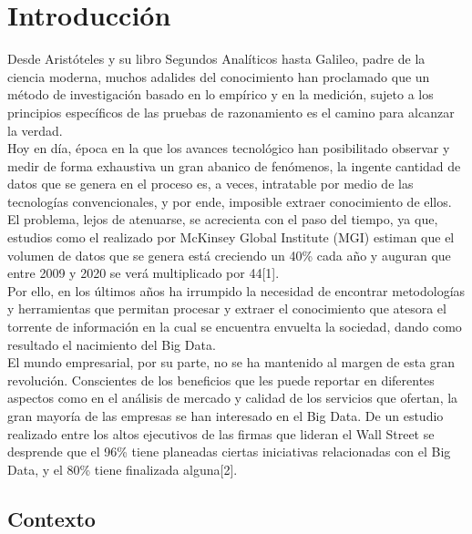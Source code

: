 
\pagestyle{fancy}

\chapter{Introducción}
\label{introduccion}

Desde Aristóteles y su libro Segundos Analíticos hasta Galileo, padre de la ciencia moderna, muchos adalides del conocimiento han proclamado que un método de investigación basado en lo empírico y en la medición, sujeto a los principios específicos de las pruebas de razonamiento es el camino para alcanzar la verdad.\\

Hoy en día, época en la que los avances tecnológico han posibilitado observar y medir de forma exhaustiva un gran abanico de fenómenos, la ingente cantidad de datos que se genera en el proceso es, a veces, intratable por medio de las tecnologías convencionales, y por ende, imposible extraer conocimiento de ellos. El problema, lejos de atenuarse, se acrecienta con el paso del tiempo, ya que, estudios como el realizado por McKinsey Global Institute (MGI) estiman que el volumen de datos que se genera está creciendo un 40\% cada año y auguran  que entre 2009 y 2020 se verá multiplicado por 44[1].\\

Por ello, en los últimos años ha irrumpido la necesidad de encontrar metodologías y herramientas que permitan procesar y extraer el conocimiento que atesora el torrente de información en la cual se encuentra envuelta la sociedad, dando como resultado el nacimiento del Big Data.\\

El mundo empresarial, por su parte, no se ha mantenido al margen de esta gran revolución. Conscientes de los beneficios que les puede reportar en diferentes aspectos como en el análisis de mercado y calidad de los servicios que ofertan, la gran mayoría de las empresas se han interesado en el Big Data. De un estudio realizado entre los altos ejecutivos de las firmas que lideran el Wall Street se desprende que el 96\% tiene planeadas ciertas iniciativas relacionadas con el Big Data, y el 80\% tiene finalizada alguna[2]. 

\section{Contexto}
 
